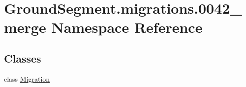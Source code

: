 \hypertarget{namespace_ground_segment_1_1migrations_1_10042__merge}{}\section{Ground\+Segment.\+migrations.0042\+\_\+merge Namespace Reference}
\label{namespace_ground_segment_1_1migrations_1_10042__merge}
\subsection*{Classes}
\begin{DoxyCompactItemize}
\item 
class \hyperlink{class_ground_segment_1_1migrations_1_10042__merge_1_1_migration}{Migration}
\end{DoxyCompactItemize}
